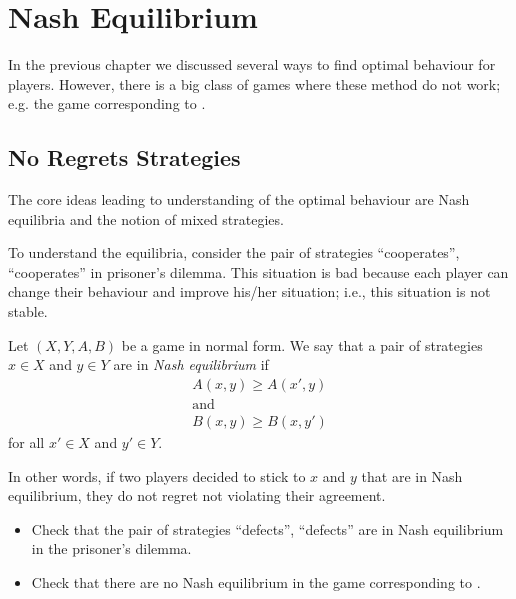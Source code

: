 \chapter{Nash Equilibrium}
In the previous chapter we discussed several ways to find optimal behaviour for
players. However, there is a big class of games where these method do not work;
e.g. the game corresponding to .

\section{No Regrets Strategies}
The core ideas leading to understanding of the optimal behaviour are Nash
equilibria and the notion of mixed strategies.

To understand the equilibria, consider the pair of strategies ``cooperates'',
``cooperates'' in prisoner's dilemma. This situation is bad because each player
can change their behaviour and improve his/her situation; i.e., this situation
is not stable.
\begin{definition}
  Let $(X, Y, A, B)$ be a game in normal form. We say that a pair of strategies
  $x \in X$ and $y \in Y$ are in \emph{Nash equilibrium} if 
  \begin{gather*}
    A(x, y) \ge A(x', y) \\
    \text{and} \\
    B(x, y) \ge B(x, y')
  \end{gather*}
  for all $x' \in X$ and $y' \in Y$.
\end{definition}
In other words, if two players decided to stick to $x$ and $y$ that are in Nash
equilibrium, they do not regret not violating their agreement.
\begin{exercise}
  \begin{itemize}
    \item Check that the pair of strategies ``defects'', ``defects'' are in Nash
      equilibrium in the prisoner's dilemma.
    \item Check that there are no Nash equilibrium in the game corresponding to
      .
  \end{itemize}
\end{exercise}

